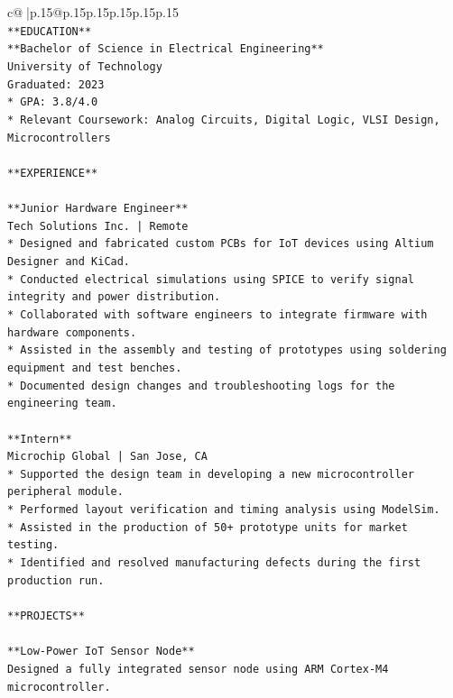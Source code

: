\documentclass{article}
\begin{document}
{\begin{supertabular}{c@{$\;$}|p{.15\linewidth}@{}p{.15\linewidth}p{.15\linewidth}p{.15\linewidth}p{.15\linewidth}p{.15\linewidth}}
{{{\\ 
\texttt{**EDUCATION**} \\
\texttt{**Bachelor of Science in Electrical Engineering**} \\
\texttt{University of Technology} \\
\texttt{Graduated: 2023} \\
\texttt{*   GPA: 3.8/4.0} \\
\texttt{*   Relevant Coursework: Analog Circuits, Digital Logic, VLSI Design, Microcontrollers} \\
\\ 
\texttt{**EXPERIENCE**} \\
\\ 
\texttt{**Junior Hardware Engineer**} \\
\texttt{Tech Solutions Inc. | Remote} \\
\texttt{*   Designed and fabricated custom PCBs for IoT devices using Altium Designer and KiCad.} \\
\texttt{*   Conducted electrical simulations using SPICE to verify signal integrity and power distribution.} \\
\texttt{*   Collaborated with software engineers to integrate firmware with hardware components.} \\
\texttt{*   Assisted in the assembly and testing of prototypes using soldering equipment and test benches.} \\
\texttt{*   Documented design changes and troubleshooting logs for the engineering team.} \\
\\ 
\texttt{**Intern**} \\
\texttt{Microchip Global | San Jose, CA} \\
\texttt{*   Supported the design team in developing a new microcontroller peripheral module.} \\
\texttt{*   Performed layout verification and timing analysis using ModelSim.} \\
\texttt{*   Assisted in the production of 50+ prototype units for market testing.} \\
\texttt{*   Identified and resolved manufacturing defects during the first production run.} \\
\\ 
\texttt{**PROJECTS**} \\
\\ 
\texttt{**Low{-}Power IoT Sensor Node**} \\
\texttt{Designed a fully integrated sensor node using ARM Cortex{-}M4 microcontroller.} \\
}}}
\end{supertabular}}
\end{document}

